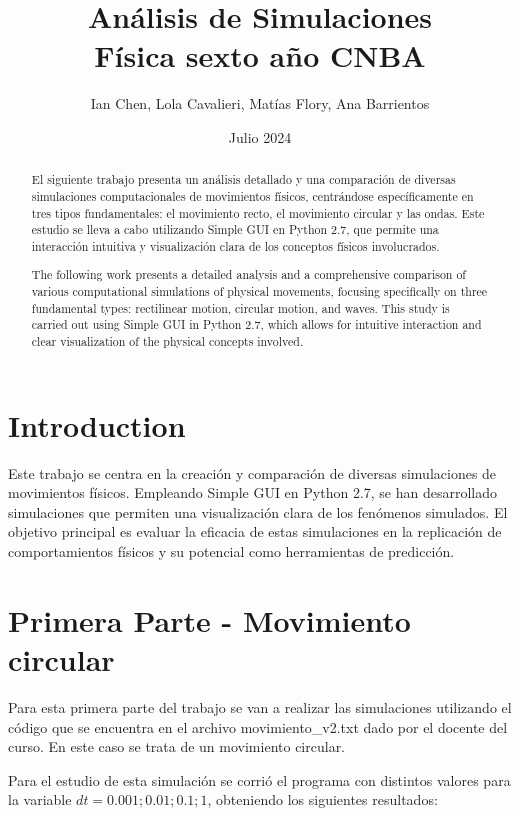 \documentclass[12pt, a4paper]{article}
\title{Análisis de Simulaciones\\[3pt] Física sexto año CNBA}
\author{Ian Chen, Lola Cavalieri, Matías Flory, Ana Barrientos}
\date{Julio 2024}
\begin{document}
\maketitle

\vspace{10pt}
\begin{abstract}
El siguiente trabajo presenta un análisis detallado y una comparación de diversas simulaciones computacionales de movimientos físicos, centrándose específicamente en tres tipos fundamentales: el movimiento recto, el movimiento circular y las ondas. Este estudio se lleva a cabo utilizando Simple GUI en Python 2.7, que permite una interacción intuitiva y visualización clara de los conceptos físicos involucrados. 
\end{abstract}

\begin{abstract}
The following work presents a detailed analysis and a comprehensive comparison of various computational simulations of physical movements, focusing specifically on three fundamental types: rectilinear motion, circular motion, and waves. This study is carried out using Simple GUI in Python 2.7, which allows for intuitive interaction and clear visualization of the physical concepts involved.
\end{abstract}


\newpage
{}
\section{Introduction}
Este trabajo se centra en la creación y comparación de diversas simulaciones de movimientos físicos. Empleando Simple GUI en Python 2.7, se han desarrollado simulaciones que permiten una visualización clara de los fenómenos simulados. El objetivo principal es evaluar la eficacia de estas simulaciones en la replicación de comportamientos físicos y su potencial como herramientas de predicción.


\section{Primera Parte - Movimiento circular}
Para esta primera parte del trabajo se van a realizar las simulaciones utilizando el código que se encuentra en el archivo movimiento\_v2.txt dado por el docente del curso. En este caso se trata de un movimiento circular. 


Para el estudio de esta simulación se corrió el programa con distintos valores para la variable $dt= 0.001; 0.01; 0.1; 1$, obteniendo los siguientes resultados:
\end{document}
